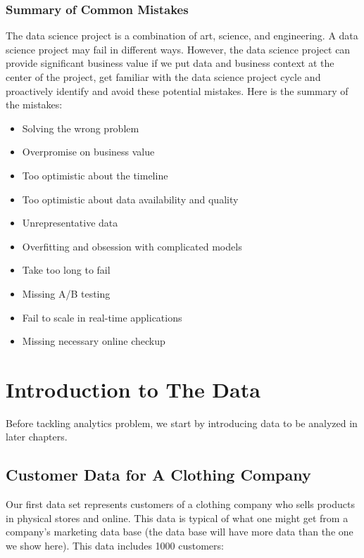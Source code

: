 \documentclass[12pt,]{krantz}
\providecommand{\tightlist}{%
  \setlength{\itemsep}{0pt}\setlength{\parskip}{0pt}}
\begin{document}
\hypertarget{summary-of-common-mistakes}{%
\subsection{Summary of Common Mistakes}\label{summary-of-common-mistakes}}

The data science project is a combination of art, science, and engineering. A data science project may fail in different ways. However, the data science project can provide significant business value if we put data and business context at the center of the project, get familiar with the data science project cycle and proactively identify and avoid these potential mistakes. Here is the summary of the mistakes:

\begin{itemize}
\tightlist
\item
  Solving the wrong problem
\item
  Overpromise on business value
\item
  Too optimistic about the timeline
\item
  Too optimistic about data availability and quality
\item
  Unrepresentative data
\item
  Overfitting and obsession with complicated models
\item
  Take too long to fail
\item
  Missing A/B testing
\item
  Fail to scale in real-time applications
\item
  Missing necessary online checkup
\end{itemize}

\hypertarget{introduction-to-the-data}{%
\chapter{Introduction to The Data}\label{introduction-to-the-data}}

Before tackling analytics problem, we start by introducing data to be analyzed in later chapters.

\hypertarget{customer-data-for-a-clothing-company}{%
\section{Customer Data for A Clothing Company}\label{customer-data-for-a-clothing-company}}

Our first data set represents customers of a clothing company who sells products in physical stores and online. This data is typical of what one might get from a company's marketing data base (the data base will have more data than the one we show here). This data includes 1000 customers:
\end{document}
